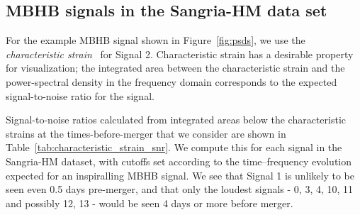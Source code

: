 \documentclass[%
 reprint,
superscriptaddress,
 nofootinbib,
 amsmath,amssymb,
 aps,
 prd,
]{revtex4-2}
\newcommand{\updated}[1]{#1}
\begin{document}
\subsection{MBHB signals in the Sangria-HM data set}
\label{subsec:expected_snr}
For the example \ac{MBHB} signal shown in Figure~\ref{fig:psds}, we use the \textit{characteristic
strain}~\cite{Moore:2014lga} for Signal 2.
Characteristic strain has a desirable property for visualization; the integrated area between the characteristic strain and the
power-spectral density in the frequency domain corresponds to the expected signal-to-noise ratio for the signal.

\updated{Signal-to-noise ratios calculated from integrated areas below the} characteristic strains at the times-before-merger that we consider are shown in
Table~\ref{tab:characteristic_strain_snr}.
We compute this for each signal in the Sangria-HM dataset, with cutoffs set according to the
time--frequency evolution expected for an inspiralling \ac{MBHB} signal.
We see that Signal 1 is unlikely to be seen even 0.5 days pre-merger, and that only the loudest signals -
0, 3, 4, 10, 11 and possibly 12, 13 - would be seen 4 days or more before merger.
\end{document}
